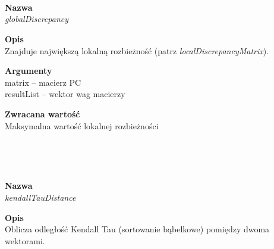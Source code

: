 \begin{spacing}{1.1}
\begin{spacing}{1.1}
\begin{spacing}{1.1}
\begin{spacing}{1.2}
\begin{spacing}{1.1}
\begin{spacing}{1.2}
\\~\\ 
\begin{spacing}{1.2}
 \\ \begin{spacing}{0.5}  \end{spacing}

\textbf{Nazwa}\\  \emph{globalDiscrepancy} \\ \begin{spacing}{0.3}  \end{spacing}
 
\textbf{Opis}\\ Znajduje największą lokalną rozbieżność (patrz \textit{localDiscrepancyMatrix}). \\  \begin{spacing}{0.3}  \end{spacing}
 
\textbf{Argumenty} \\
matrix -- macierz PC \\ 
resultList -- wektor wag macierzy \\  \begin{spacing}{0.3}  \end{spacing}

\textbf{Zwracana wartość}\\ Maksymalna wartość lokalnej rozbieżności \end{spacing}\\



\newpage
\begin{spacing}{1.2}
 \\ \begin{spacing}{0.5}  \end{spacing}

\textbf{Nazwa}\\  \emph{kendallTauDistance} \\ \begin{spacing}{0.3}  \end{spacing}
 
\textbf{Opis}\\ Oblicza odległość Kendall Tau (sortowanie bąbelkowe) pomiędzy dwoma wektorami. \\  \begin{spacing}{0.3}  \end{spacing}
 

\end{spacing}
\end{spacing}
\end{spacing}
\end{spacing}
\end{spacing}
\end{spacing}
\end{spacing}

